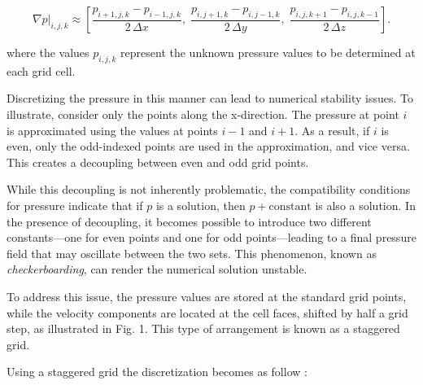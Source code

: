 \documentclass[12pt]{article}
\begin{document}
\[
\nabla p \big|_{i,j,k} \approx 
\left[
    \frac{p_{i+1,j,k} - p_{i-1,j,k}}{2\,\Delta x},\;
    \frac{p_{i,j+1,k} - p_{i,j-1,k}}{2\,\Delta y},\;
    \frac{p_{i,j,k+1} - p_{i,j,k-1}}{2\,\Delta z}
\right].
\]

where the values \(p_{i,j,k}\) represent the unknown pressure values to be 
determined at each grid cell.

Discretizing the pressure in this manner can lead to numerical stability 
issues. To illustrate, consider only the points along the x-direction. 
The pressure at point \(i\) is approximated using the values at points 
\(i-1\) and \(i+1\). As a result, if \(i\) is even, only the odd-indexed 
points are used in the approximation, and vice versa. This creates a 
decoupling between even and odd grid points.

While this decoupling is not inherently problematic, the compatibility 
conditions for pressure indicate that if \(p\) is a solution, then 
\(p + \text{constant}\) is also a solution. In the presence of decoupling, 
it becomes possible to introduce two different constants—one for even 
points and one for odd points—leading to a final pressure field that may 
oscillate between the two sets. This phenomenon, known as 
\textit{checkerboarding}, can render the numerical solution unstable.

To address this issue, the pressure values are stored at the standard grid 
points, while the velocity components are located at the cell faces, shifted 
by half a grid step, as illustrated in Fig. 1. This type of arrangement is 
known as a staggered grid.

Using a staggered grid the discretization becomes as follow : 
\end{document}
